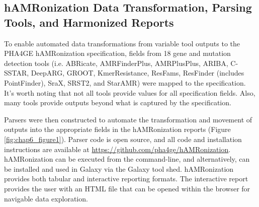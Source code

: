 

\subsection{hAMRonization Data Transformation, Parsing Tools, and Harmonized Reports}

To enable automated data transformations from variable tool outputs to the PHA4GE hAMRonization specification, fields from 18 gene and mutation detection tools (i.e. ABRicate, AMRFinderPlus, AMRPlusPlus, ARIBA, C-SSTAR, DeepARG, GROOT, KmerResistance, ResFams, ResFinder (includes PointFinder), SraX, SRST2, and StarAMR) were mapped to the specification. It’s worth noting that not all tools provide values for all specification fields. Also, many tools provide outputs beyond what is captured by the specification. 

Parsers were then constructed to automate the transformation and movement of outputs into the appropriate fields in the hAMRonization reports (Figure \ref{fig:chap6_figure1}). Parser code is open source, and all code and installation instructions are available at \url{https://github.com/pha4ge/hAMRonization}. hAMRonization can be executed from the command-line, and alternatively, can be installed and used in Galaxy via the Galaxy tool shed.
hAMRonization provides both tabular and interactive reporting formats. The interactive report provides the user with an HTML file that can be opened within the browser for navigable data exploration.

